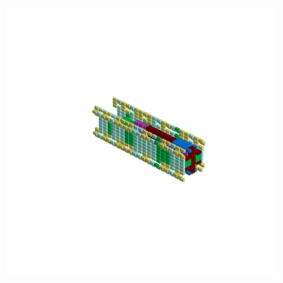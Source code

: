 \begin{minipage}[b]{0.50\linewidth}
\begin{figure}[H]
        \vspace*{-8cm}
        \hspace*{2cm}
        \includegraphics[width=8cm]{src/symmetries/pattern2_4-45.png}
        \vspace*{-2.5cm}
  \caption*{}
  \end{figure}
\end{minipage}
\hspace{1cm}
